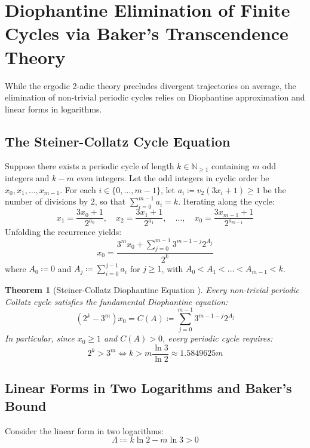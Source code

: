 \documentclass[11pt,a4paper]{article}
\newtheorem{theorem}{Theorem}[section]
\theoremstyle{definition}
\begin{document}
\section{Diophantine Elimination of Finite Cycles via Baker's Transcendence Theory}
While the ergodic 2-adic theory precludes divergent trajectories on average, the elimination of non-trivial periodic cycles relies on Diophantine approximation and linear forms in logarithms.

\subsection{The Steiner-Collatz Cycle Equation}
Suppose there exists a periodic cycle of length $k \in \mathbb{N}_{\ge 1}$ containing $m$ odd integers and $k - m$ even integers. Let the odd integers in cyclic order be $x_0, x_1, \dots, x_{m-1}$.
For each $i \in \{0, \dots, m-1\}$, let $a_i \coloneqq v_2(3x_i + 1) \ge 1$ be the number of divisions by $2$, so that $\sum_{i=0}^{m-1} a_i = k$.
Iterating along the cycle:
\begin{equation}
x_1 = \frac{3x_0 + 1}{2^{a_0}}, \quad x_2 = \frac{3x_1 + 1}{2^{a_1}}, \quad \dots, \quad x_0 = \frac{3x_{m-1} + 1}{2^{a_{m-1}}}
\end{equation}
Unfolding the recurrence yields:
\begin{equation}
x_0 = \frac{3^m x_0 + \sum_{j=0}^{m-1} 3^{m-1-j} 2^{A_j}}{2^k}
\end{equation}
where $A_0 \coloneqq 0$ and $A_j \coloneqq \sum_{i=0}^{j-1} a_i$ for $j \ge 1$, with $A_0 < A_1 < \dots < A_{m-1} < k$.

\begin{theorem}[Steiner-Collatz Diophantine Equation \cite{steiner1977}]\label{thm:steiner_eq}
Every non-trivial periodic Collatz cycle satisfies the fundamental Diophantine equation:
\begin{equation}\label{eq:steiner_diophantine}
\left( 2^k - 3^m \right) x_0 = C(A) \coloneqq \sum_{j=0}^{m-1} 3^{m-1-j} 2^{A_j}
\end{equation}
In particular, since $x_0 \ge 1$ and $C(A) > 0$, every periodic cycle requires:
\begin{equation}
2^k > 3^m \iff k > m \frac{\ln 3}{\ln 2} \approx 1.5849625 m
\end{equation}
\end{theorem}

\subsection{Linear Forms in Two Logarithms and Baker's Bound}
Consider the linear form in two logarithms:
\begin{equation}
\Lambda \coloneqq k \ln 2 - m \ln 3 > 0
\end{equation}
\end{document}
